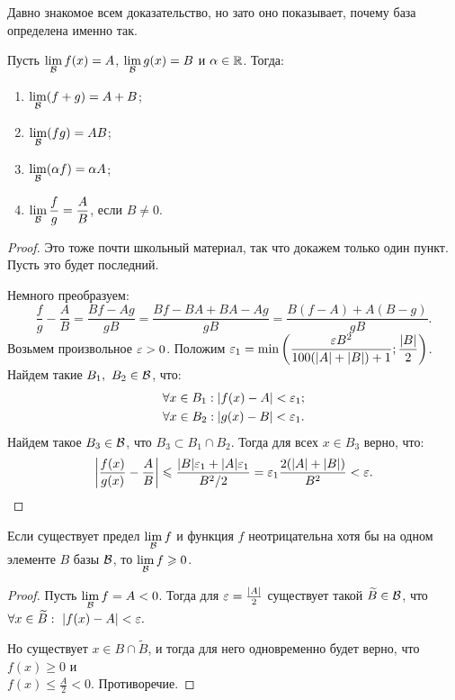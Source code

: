 Давно знакомое всем доказательство, но зато оно показывает, почему база определена именно так.

\begin{Statement}
Пусть $\lim\limits_{\mathcal{B}} f(x) = A$, $\lim\limits_{\mathcal{B}}g(x) = B$ и $\alpha \in \mathbb{R}$. Тогда:
\begin{enumerate}
\item $\lim\limits_{\mathcal{B}}(f + g) = A + B$;
\item $\lim\limits_{\mathcal{B}}(fg) = AB$;
\item $\lim\limits_{\mathcal{B}}(\alpha f) = \alpha A$;
\item $\lim\limits_{\mathcal{B}}\dfrac{f}{g} = \dfrac{A}{B}$, если $B \neq 0$.
\end{enumerate} 
\end{Statement}

\begin{proof}
Это тоже почти школьный материал, так что докажем только один пункт. Пусть это будет последний.

Немного преобразуем:
$$
\frac{f}{g} - \frac{A}{B} = \frac{Bf - Ag}{gB} = \frac{Bf - BA + BA - Ag}{gB} = \frac{B(f - A) + A(B - g)}{gB}.
$$
Возьмем произвольное $\varepsilon > 0$. Положим $\varepsilon_1 = \min\left( \dfrac{\varepsilon B^2}{100(|A| + |B|) + 1}; \dfrac{|B|}{2} \right)$. Найдем такие $B_1,\ B_2 \in \mathcal{B}$, что:
\begin{gather}
\forall x \in B_1: |f(x) - A| < \varepsilon_1;\\
\forall x \in B_2: |g(x) - B| < \varepsilon_1.
\end{gather}
Найдем такое $B_3 \in \mathcal{B}$, что $B_3 \subset B_1 \cap B_2$. Тогда для всех $x \in B_3$ верно, что:
$$
\left| \frac{f(x)}{g(x)} - \frac{A}{B} \right| \leqslant \frac{|B|\varepsilon_1 + |A|\varepsilon_1}{B^2 / 2} = \varepsilon_1 \frac{2(|A| + |B|)}{B^2} < \varepsilon.
$$
\end{proof}

\begin{Statement}
Если существует предел $\lim\limits_{\mathcal{B}}f$ и функция $f$ неотрицательна хотя бы на одном элементе $B$ базы $\mathcal{B}$, то $\lim\limits_{\mathcal{B}}f \geqslant 0$.
\end{Statement}
\begin{proof}
Пусть $\lim\limits_{\mathcal{B}}f = A < 0$. Тогда для $\varepsilon = \frac{|A|}{2}$ существует такой $\widetilde{B} \in \mathcal{B}$, что $\forall x \in \widetilde{B}:\ |f(x) - A| < \varepsilon.$

Но существует $x \in B \cap \widetilde{B}$, и тогда для него одновременно будет верно, что $f(x) \geq 0$ и\\ $f(x) \leq \frac{A}{2} < 0$. Противоречие.
\end{proof}


